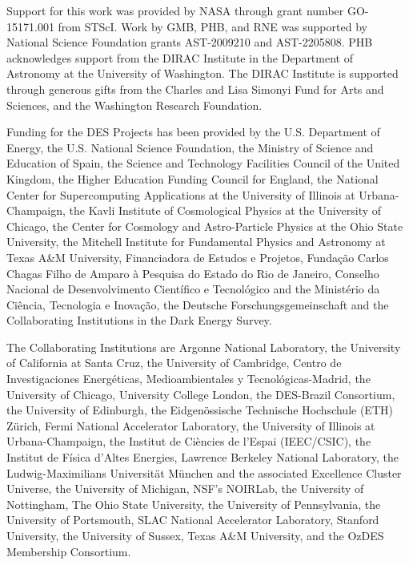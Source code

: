 \documentclass[onecolumn]{aastex631}
\begin{document}
Support for this work was provided by NASA through grant number GO-15171.001 from STScI.  Work by GMB, PHB, and RNE was supported by National Science Foundation grants AST-2009210 and AST-2205808. PHB acknowledges support from the DIRAC Institute in the Department of Astronomy at the University of Washington. The DIRAC Institute is supported through generous gifts from the Charles and Lisa Simonyi Fund for Arts and Sciences, and the Washington Research Foundation.

Funding for the DES Projects has been provided by the U.S. Department of Energy, the U.S. National Science Foundation, the Ministry of Science and Education of Spain, 
the Science and Technology Facilities Council of the United Kingdom, the Higher Education Funding Council for England, the National Center for Supercomputing 
Applications at the University of Illinois at Urbana-Champaign, the Kavli Institute of Cosmological Physics at the University of Chicago, 
the Center for Cosmology and Astro-Particle Physics at the Ohio State University,
the Mitchell Institute for Fundamental Physics and Astronomy at Texas A\&M University, Financiadora de Estudos e Projetos, 
Funda{\c c}{\~a}o Carlos Chagas Filho de Amparo {\`a} Pesquisa do Estado do Rio de Janeiro, Conselho Nacional de Desenvolvimento Cient{\'i}fico e Tecnol{\'o}gico and 
the Minist{\'e}rio da Ci{\^e}ncia, Tecnologia e Inova{\c c}{\~a}o, the Deutsche Forschungsgemeinschaft and the Collaborating Institutions in the Dark Energy Survey. 

The Collaborating Institutions are Argonne National Laboratory, the University of California at Santa Cruz, the University of Cambridge, Centro de Investigaciones Energ{\'e}ticas, 
Medioambientales y Tecnol{\'o}gicas-Madrid, the University of Chicago, University College London, the DES-Brazil Consortium, the University of Edinburgh, 
the Eidgen{\"o}ssische Technische Hochschule (ETH) Z{\"u}rich, 
Fermi National Accelerator Laboratory, the University of Illinois at Urbana-Champaign, the Institut de Ci{\`e}ncies de l'Espai (IEEC/CSIC), 
the Institut de F{\'i}sica d'Altes Energies, Lawrence Berkeley National Laboratory, the Ludwig-Maximilians Universit{\"a}t M{\"u}nchen and the associated Excellence Cluster Universe, 
the University of Michigan, NSF's NOIRLab, the University of Nottingham, The Ohio State University, the University of Pennsylvania, the University of Portsmouth, 
SLAC National Accelerator Laboratory, Stanford University, the University of Sussex, Texas A\&M University, and the OzDES Membership Consortium.
\end{document}
